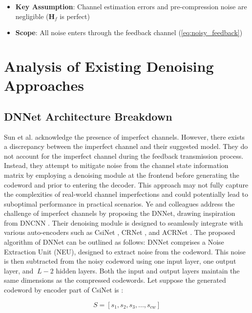 \documentclass[lettersize,journal]{IEEEtran}
\begin{document}
\begin{itemize}
    \item \textbf{Key Assumption}: Channel estimation errors and pre-compression noise are negligible ($\mathbf{H}_f$ is perfect)
    \item \textbf{Scope}: All noise enters through the feedback channel (\eqref{eq:noisy_feedback})
\end{itemize}

\section{Analysis of Existing Denoising Approaches}
\subsection{DNNet Architecture Breakdown}

Sun et al. \cite{bbb1} acknowledge the presence of imperfect channels. However, there exists a discrepancy between the imperfect channel and their suggested model. They do not account for the imperfect channel during the feedback transmission process. Instead, they attempt to mitigate noise from the channel state information matrix by employing a denoising module at the frontend before generating the codeword and prior to entering the decoder. This approach may not fully capture the complexities of real-world channel imperfections and could potentially lead to suboptimal performance in practical scenarios.
Ye and colleagues \cite{abw} address the challenge of imperfect channels by proposing the DNNet, drawing inspiration from DNCNN \cite{ccc1}. Their denoising module is designed to seamlessly integrate with various auto-encoders such as CsiNet \cite{abe}, CRNet \cite{abn}, and ACRNet \cite{aby}.
The proposed algorithm of DNNet can be outlined as follows:
DNNet comprises a Noise Extraction Unit (NEU), designed to extract noise from the codeword. This noise is then subtracted from the noisy codeword using one input layer, one output layer, and 
\begin{math} \ L-2 \end{math} hidden layers. Both the input and output layers maintain the same dimensions as the compressed codewords. Let suppose the generated codeword by encoder part of CsiNet is :

\begin{equation}
		S=[s_{1},s_{2},s_{3},...,s_{cw}]
\end{equation}
\end{document}
